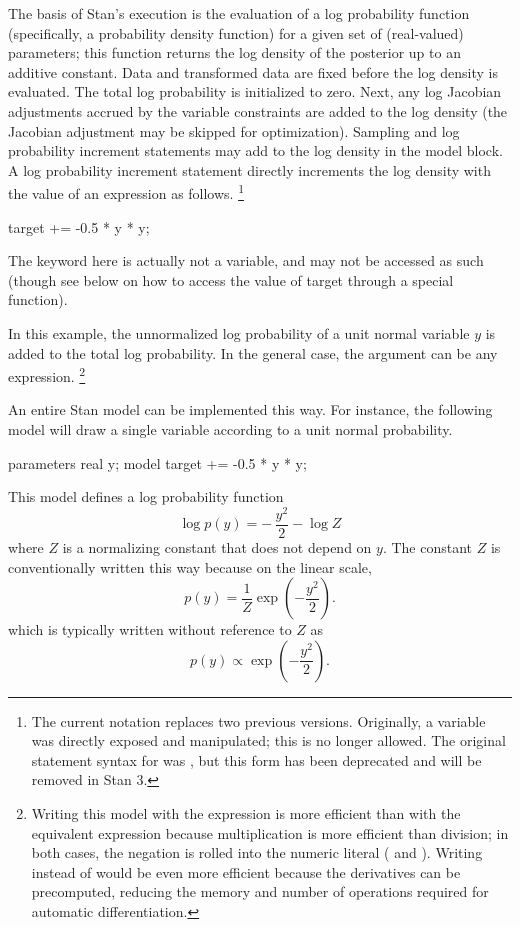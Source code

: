 The basis of Stan's execution is the evaluation of a log probability
function (specifically, a probability density function) for a given
set of (real-valued) parameters; this function returns the log density
of the posterior up to an additive constant.  Data and transformed
data are fixed before the log density is evaluated.  The total log
probability is initialized to zero.  Next, any log Jacobian
adjustments accrued by the variable constraints are added to the log
density (the Jacobian adjustment may be skipped for optimization).
Sampling and log probability increment statements may add to the log
density in the model block.  A log probability increment statement
directly increments the log density with the value of an expression as
follows.%
%
\footnote{The current notation replaces two previous versions.
  Originally, a variable  was directly exposed and
  manipulated;  this is no longer allowed.  The original statement
  syntax for  was ,
  but this form has been deprecated and will be removed in Stan 3.}
%
\begin{stancode}
target += -0.5 * y * y;
\end{stancode}
%
The keyword  here is actually not a variable, and may not
be accessed as such (though see below on how to access the value of
target through a special function).

In this example, the unnormalized log probability of a unit normal
variable $y$ is added to the total log probability.  In the general
case, the argument can be any expression.%
%
\footnote{Writing this model with the expression 
  is more efficient than with the equivalent expression  because multiplication is more efficient than division; in
  both cases, the negation is rolled into the numeric literal
  ( and ).  Writing  instead of
   would be even more efficient because the derivatives
  can be precomputed, reducing the memory and number of operations
  required for automatic differentiation.}

An entire Stan model can be implemented this way.  For instance, the
following model will draw a single variable according to a unit normal
probability.
%
\begin{stancode}
parameters {
  real y;
}
model {
  target += -0.5 * y * y;
}
\end{stancode}
%
This model defines a log probability function
%
\[
\log p(y) = - \, \frac{y^2}{2} - \log Z
\]
%
where $Z$ is a normalizing constant that does not depend on $y$.  The
constant $Z$ is conventionally written this way because on the linear
scale,
\[
p(y) = \frac{1}{Z} \exp\left(-\frac{y^2}{2}\right).
\]
which is typically written without reference to $Z$ as
\[
p(y) \propto \exp\left(-\frac{y^2}{2}\right).
\]

